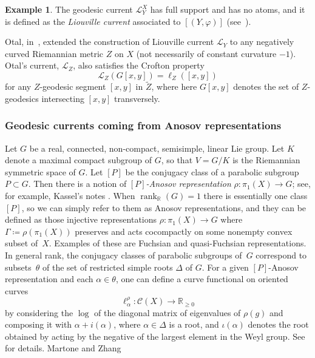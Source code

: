 \documentclass[12pt,article]{amsart}
\numberwithin{equation}{section}
\numberwithin{figure}{section}
\theoremstyle{definition}
\newtheorem{example}[equation]{Example}
\theoremstyle{plain}
\newcommand*{\wt}[1]{\widetilde{#1}}
\begin{document}
\begin{example}
The geodesic current $\mathcal{L}_Y^X$  has full support and has no atoms, and it is defined as the \emph{Liouville current} associated to $[(Y,\varphi)]$ (see~\cite[Page~145]{Bonahon88:GeodesicCurrent}).

Otal, in~\cite[Page~155]{Otal90:SpectreMarqueNegative}, extended the construction of Liouville current $\mathcal{L}_Y$ to any negatively curved Riemannian metric $Z$ on $X$ (not necessarily of constant curvature $-1$). Otal's current, $\mathcal{L}_Z$, also satisfies the Crofton property
\[
\mathcal{L}_Z(G[x,y])=\ell_{Z}([x,y])
\]
for any $Z$-geodesic segment $[x,y]$ in $\wt{Z}$, where here $G[x,y]$ denotes the set of $Z$-geodesics intersecting $[x,y]$ transversely. 
\end{example}

\subsubsection{Geodesic currents coming from Anosov representations}
\label{subsubsec:positivelyratioed}
Let $G$ be a real, connected, non-compact, semisimple, linear Lie group. Let $K$ denote a maximal compact subgroup of $G$, 
so that $V=G/K$ is the Riemannian symmetric space of $G$. Let $[P]$ be the conjugacy class of
a parabolic subgroup $P \subset G$. 
Then there is a notion of \emph{$[P]$-Anosov representation} $\rho\colon \pi_1(X) \to G$; see, for example, Kassel's notes \cite[Section~4]{K18:GeometricStructures}.
When $\operatorname{rank}_{\mathbb{R}}(G)=1$ there is essentially one
class $[P]$, so we can simply refer to them as Anosov representations,
and they can be defined as those injective representations
$\rho\colon \pi_1(X) \to G$ where $\Gamma\coloneqq \rho(\pi_1(X))$
preserves and acts cocompactly on some nonempty convex
subset of~$X$. 
Examples of these are Fuchsian and quasi-Fuchsian representations.
In general rank, the conjugacy classes of parabolic subgroups of~$G$ correspond to
subsets~$\theta$ of the set of restricted simple roots $\Delta$ of $G$. 
For a given $[P]$-Anosov representation and each $\alpha \in \theta$, 
one can define a curve functional on oriented curves
\[
\ell_{\alpha}^{\rho}\colon \mathcal{C}(X) \to \mathbb{R}_{\geq 0}
\]
by considering the $\log$ of the diagonal matrix of eigenvalues of $\rho(g)$ and composing it with $\alpha + i(\alpha)$, where $\alpha \in \Delta$ is a root, and 
$\iota(\alpha)$ denotes the root obtained by acting by the negative of the largest element in the Weyl group. See~\cite[Section~2]{MZ19:PositivelyRatioed} for details.
Martone and Zhang
\end{document}
